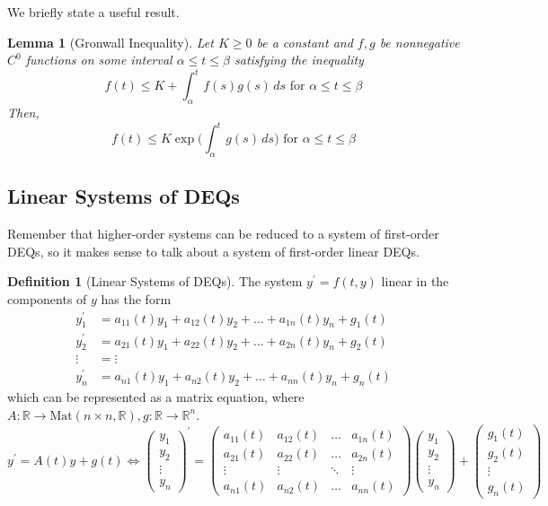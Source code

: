 \documentclass{article}
\newtheorem{lemma}[theorem]{Lemma}
\theoremstyle{remark}
\theoremstyle{definition}
\newtheorem{definition}{Definition}[section]
\begin{document}
We briefly state a useful result. 

\begin{lemma}[Gronwall Inequality]
Let $K \geq 0$ be a constant and $f, g$ be nonnegative $C^0$ functions on some interval $\alpha \leq t \leq \beta$ satisfying the inequality
\[f(t) \leq K + \int_\alpha^t f(s) g(s) \, ds \text{ for } \alpha \leq t \leq \beta\]
Then, 
\[f(t) \leq K \exp \bigg( \int_{\alpha}^t g(s) \,ds \bigg) \text{ for } \alpha \leq t \leq \beta\]
\end{lemma}

\subsection{Linear Systems of DEQs}
Remember that higher-order systems can be reduced to a system of first-order DEQs, so it makes sense to talk about a system of first-order linear DEQs. 

\begin{definition}[Linear Systems of DEQs]
The system $y^\prime = f(t, y)$ linear in the components of $y$ has the form 
\begin{align*}
    y_1^\prime & = a_{11}(t) y_1 + a_{12}(t) y_2 + \ldots + a_{1n}(t) y_n + g_1 (t) \\
    y_2^\prime & = a_{21}(t) y_1 + a_{22}(t) y_2 + \ldots + a_{2n}(t) y_n + g_2 (t) \\
    \vdots & = \vdots \\
    y_n^\prime & = a_{n1}(t) y_1 + a_{n2}(t) y_2 + \ldots + a_{nn}(t) y_n + g_n (t)
\end{align*}
which can be represented as a matrix equation, where $A: \mathbb{R} \longrightarrow \text{Mat}(n \times n, \mathbb{R}), g: \mathbb{R} \longrightarrow \mathbb{R}^n$. 
\[y^\prime = A(t) y + g(t) \iff \begin{pmatrix}
y_1 \\ y_2 \\ \vdots \\ y_n
\end{pmatrix}^\prime = \begin{pmatrix}
a_{11}(t) & a_{12} (t) & \ldots & a_{1n}(t) \\
a_{21}(t) & a_{22} (t) & \ldots & a_{2n}(t) \\
\vdots & \vdots & \ddots & \vdots \\
a_{n1}(t) & a_{n2} (t) & \ldots & a_{nn}(t) 
\end{pmatrix} \begin{pmatrix}
y_1 \\ y_2 \\ \vdots \\ y_n
\end{pmatrix} + \begin{pmatrix}
g_1 (t) \\ g_2 (t) \\ \vdots \\ g_n (t) 
\end{pmatrix}\]
\end{definition}
\end{document}
